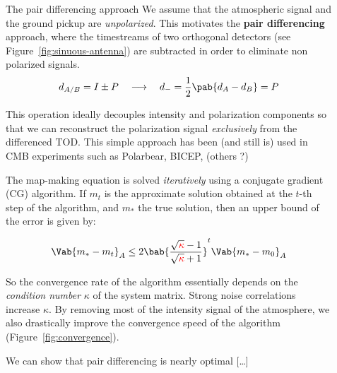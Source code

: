 \documentclass[final]{beamer}
\newlength{\sepwidth}
\newlength{\colwidth}
\newcommand{\separatorcolumn}{\begin{column}{\sepwidth}\end{column}}
\begin{document}
\begin{frame}[t]
\begin{columns}[t]
\begin{column}{\colwidth}
\begin{block}{The pair differencing approach}
        We assume that the atmospheric signal and the ground pickup are \emph{unpolarized}.
        This motivates the \textbf{pair differencing} approach, where the timestreams of two orthogonal detectors (see Figure~\ref{fig:sinuous-antenna}) are subtracted in order to eliminate non polarized signals.
        \[
          d_{A/B} = I \pm P
          \quad\longrightarrow\quad
          d_- = \frac12 \pab{d_A - d_B} = P
        \]

        This operation ideally decouples intensity and polarization components so that we can reconstruct the polarization signal \emph{exclusively} from the differenced TOD.
        This simple approach has been (and still is) used in CMB experiments such as Polarbear, BICEP, (others ?) %


        The map-making equation is solved \emph{iteratively} using a conjugate gradient (CG) algorithm.
        If $m_t$ is the approximate solution obtained at the $t$-th step of the algorithm, and $m_\ast$ the true solution, then an upper bound of the error is given by:

        \begin{equation}
          \Vab{m_\ast - m_t}_A \leq 2 \bab{\frac{\sqrt{\mathcolor{red}{\kappa}} - 1}{\sqrt{\mathcolor{red}{\kappa}} + 1}}^t \Vab{m_\ast - m_0}_A
        \end{equation}

        So the convergence rate of the algorithm essentially depends on the \emph{condition number} $\kappa$ of the system matrix.
        Strong noise correlations increase $\kappa$. By removing most of the intensity signal of the atmosphere, we also drastically improve the convergence speed of the algorithm (Figure~\ref{fig:convergence}). %

        We can show that pair differencing is nearly optimal [\dots]

      \end{block}

    \end{column}

    \separatorcolumn

    \begin{column}{\colwidth}

      \begin{block}{}


\end{block}
\end{column}
\end{columns}
\end{frame}
\end{document}

